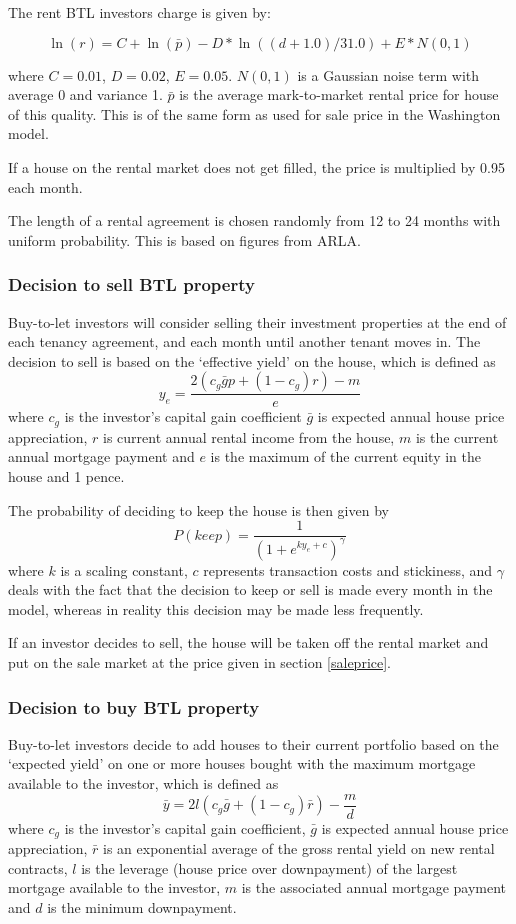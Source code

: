\documentclass{article}
\begin{document}
The rent BTL investors charge is given by:

\begin{equation}
\ln(r)=C+\ln (\bar{p})-D\ast \ln((d+1.0)/31.0)+E\ast N(0,1)
\end{equation}

\bigskip

where $C=0.01$, $D=0.02$, $E=0.05$. $N(0,1)$ is a Gaussian noise term with
average 0 and variance 1. $\bar{p}$ is the average mark-to-market rental
price for house of this quality. This is of the same form as used for sale price in the Washington model.

If a house on the rental market does not get filled, the price is multiplied by 0.95 each month.

The length of a rental agreement is
chosen randomly from 12 to 24 months with uniform probability. This is based on figures from ARLA.

\subsubsection{Decision to sell BTL property}
\label{sellbtl}
Buy-to-let investors will consider selling their investment properties at the end of each tenancy agreement, and each month until another tenant moves in. The decision to sell is based on the `effective yield' on the house, which is defined as
\[
y_e = \frac{2(c_g \bar{g}p + (1-c_g)r) - m}{e} 
\]
where $c_g$ is the investor's capital gain coefficient $\bar{g}$ is expected annual house price appreciation, $r$ is current annual rental income from the house, $m$ is the current annual mortgage payment and $e$ is the maximum of the current equity in the house and 1 pence.

The probability of deciding to keep the house is then given by
\[
P(keep) = \frac{1}{(1 + e^{ky_e+c})^\gamma}
\]
where $k$ is a scaling constant, $c$ represents transaction costs and stickiness, and $\gamma$ deals with the fact that the decision to keep or sell is made every month in the model, whereas in reality this decision may be made less frequently.

If an investor decides to sell, the house will be taken off the rental market and put on the sale market at the price given in section \ref{saleprice}.

\subsubsection{Decision to buy BTL property}
Buy-to-let investors decide to add houses to their current portfolio based on the `expected yield' on one or more houses bought with the maximum mortgage available to the investor, which is defined as
\[
\bar{y} = 2l(c_g \bar{g} + (1-c_g)\bar{r}) - \frac{m}{d} 
\]
where $c_g$ is the investor's capital gain coefficient, $\bar{g}$ is expected annual house price appreciation, $\bar{r}$ is an exponential average of the gross rental yield on new rental contracts, $l$ is the leverage (house price over downpayment) of the largest mortgage available to the investor, $m$ is the associated annual mortgage payment and $d$ is the minimum downpayment.
\end{document}
